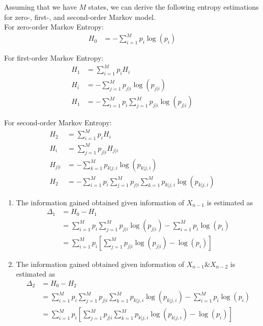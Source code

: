 \documentclass[a4paper,11pt]{book}
\begin{document}
\begin{solution}
Assuming that we have $M$ states, we can derive the following entropy estimations for zero-, first-, and second-order Markov model. \\
For zero-order Markov Entropy: \\
\begin{equation}
\begin{aligned}
H_0 &= - \sum_{i=1}^{M} p_i\log(p_i)
\end{aligned}
\end{equation}

For first-order Markov Entropy: \\
\begin{equation}
\begin{aligned}
H_1 &= \sum_{i=1}^{M} p_i H_i \\
H_i &= - \sum_{j=1}^{M} p_{j|i} \log( p_{j|i} ) \\
H_1 &= - \sum_{i=1}^{M} p_i \sum_{j=1}^{M} p_{j|i} \log( p_{j|i} ) 
\end{aligned}
\end{equation}

For second-order Markov Entropy: \\ 
\begin{equation}
\begin{aligned}
H_2 &= \sum_{i=1}^{M} p_i H_i \\
H_i &= \sum_{j=1}^{M} p_{j|i} H_{j|i}  \\
H_{j|i} &= - \sum_{k=1}^{M} p_{k|j,i} \log( p_{k|j,i} ) \\
H_2 &= - \sum_{i=1}^{M} p_i \sum_{j=1}^{M} p_{j|i} \sum_{k=1}^{M} p_{k|j,i} \log( p_{k|j,i} )
\end{aligned}
\end{equation}

\begin{enumerate}
\item The information gained obtained given information of $X_{n-1}$ is estimated as \\ 
\begin{equation}
\begin{aligned}
\Delta_1 &= H_0 - H_1 \\
 &= \sum_{i=1}^{M} p_i \sum_{j=1}^{M} p_{j|i} \log( p_{j|i})-\sum_{i=1}^{M} p_i\log(p_i)   \\
 &= \sum_{i=1}^{M} p_i[\sum_{j=1}^{M} p_{j|i} \log( p_{j|i} ) - \log(p_i)]
\end{aligned}
\end{equation}
\item The information gained obtained given information of $X_{n-1} \&X_{n-2}$ is estimated as \\ 
\begin{equation}
\begin{aligned}
\Delta_2 &= H_0 - H_2 \\
 &= \sum_{i=1}^{M} p_i \sum_{j=1}^{M} p_{j|i} \sum_{k=1}^{M} p_{k|j,i} \log( p_{k|j,i} ) -\sum_{i=1}^{M} p_i\log(p_i)   \\
 &= \sum_{i=1}^{M} p_i[\sum_{j=1}^{M} p_{j|i} \sum_{k=1}^{M} p_{k|j,i} \log( p_{k|j,i} ) - \log(p_i)]
\end{aligned}
\end{equation}

\end{enumerate}
\end{solution}
\end{document}
